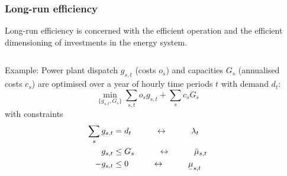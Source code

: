 \documentclass[10pt,aspectratio=169,dvipsnames]{beamer}
\def\l{\lambda}
\def\m{\mu}
\newcommand{\ubar}[1]{\text{\b{$#1$}}}
\begin{document}
\begin{frame}
  \frametitle{Long-run efficiency}


  Long-run efficiency is concerned with the \alert{efficient operation} and \alert{the efficient dimensioning of investments} in the energy system.

  \begin{columns}[T]
    \begin{column}{7.5cm}

      \alert{Example}: Power plant \alert{dispatch} $g_{s,t}$ (costs $o_s$) and \alert{capacities} $G_s$ (annualised costs $c_s$) are optimised over a year of hourly time periods $t$ with demand $d_t$:
      \begin{equation*}
        \min_{\{g_{s,t},G_s\}} \sum_{s,t} o_s g_{s,t} + \sum_s c_s G_s
      \end{equation*}
      with constraints
  \begin{align*}
    \sum_s g_{s,t} & = d_t\hspace{1cm} \leftrightarrow \hspace{1cm} \l_t \\
        g_{s,t}   & \leq  G_s  \hspace{1cm}\leftrightarrow\hspace{1cm} \bar{\m}_{s,t} \\
    - g_{s,t}  & \leq  0  \hspace{1cm}\leftrightarrow\hspace{1cm} \ubar{\m}_{s,t}
  \end{align*}
    \end{column}
    \begin{column}{7cm}


    \end{column}
  \end{columns}

\end{frame}
\end{document}
